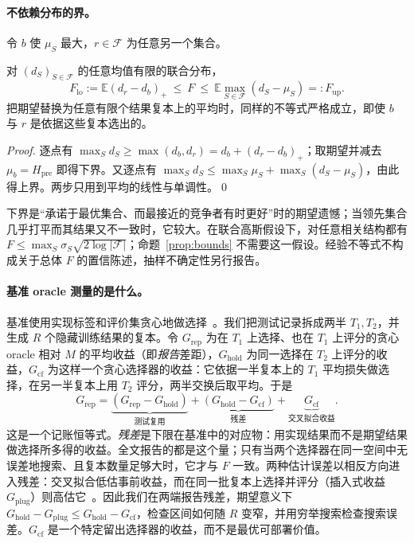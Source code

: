 \documentclass[runningheads]{llncs}
\newcommand{\Hpre}{H_{\mathrm{pre}}}
\begin{document}
\paragraph{不依赖分布的界。}令 $b$ 使 $\mu_S$ 最大，$r\in\mathcal F$ 为任意另一个集合。
\begin{mprop}\label{prop:bounds}
对 $(d_S)_{S\in\mathcal F}$ 的任意均值有限的联合分布，
\begin{equation}
 F_{\mathrm{lo}}:=\mathbb E(d_r-d_b)_+\ \le\ F\ \le\ \mathbb E\max_{S\in\mathcal F}(d_S-\mu_S)=:F_{\mathrm{up}} .\label{eq:bounds}
\end{equation}
把期望替换为任意有限个结果复本上的平均时，同样的不等式严格成立，即使 $b$ 与 $r$ 是依据这些复本选出的。
\end{mprop}
\begin{proof}
逐点有 $\max_S d_S\ge\max(d_b,d_r)=d_b+(d_r-d_b)_+$；取期望并减去 $\mu_b=\Hpre$ 即得下界。又逐点有 $\max_S d_S\le\max_S\mu_S+\max_S(d_S-\mu_S)$，由此得上界。两步只用到平均的线性与单调性。\qed
\end{proof}
下界是“承诺于最优集合、而最接近的竞争者有时更好”时的期望遗憾；当领先集合几乎打平而其结果又不一致时，它较大。在联合高斯假设下，对任意相关结构都有 $F\le\max_S\sigma_S\sqrt{2\log|\mathcal F|}$；命题~\ref{prop:bounds} 不需要这一假设。经验不等式不构成关于总体 $F$ 的置信陈述，抽样不确定性另行报告。

\paragraph{基准 oracle 测量的是什么。}基准使用实现标签和评价集贪心地做选择~\cite{werner2023comparable,werner2024cdalbench}。我们把测试记录拆成两半 $T_1,T_2$，并生成 $R$ 个隐藏训练结果的复本。令 $G_{\mathrm{rep}}$ 为在 $T_1$ 上选择、也在 $T_1$ 上评分的贪心 oracle 相对 $M$ 的平均收益（即\emph{报告}差距），$G_{\mathrm{hold}}$ 为同一选择在 $T_2$ 上评分的收益，$G_{\mathrm{cf}}$ 为这样一个贪心选择器的收益：它依据一半复本上的 $T_1$ 平均损失做选择，在另一半复本上用 $T_2$ 评分，两半交换后取平均。于是
\begin{equation}
 G_{\mathrm{rep}}=\underbrace{(G_{\mathrm{rep}}-G_{\mathrm{hold}})}_{\text{测试复用}}+\underbrace{(G_{\mathrm{hold}}-G_{\mathrm{cf}})}_{\text{残差}}+\underbrace{G_{\mathrm{cf}}}_{\text{交叉拟合收益}} .\label{eq:greedy}
\end{equation}
这是一个记账恒等式。\emph{残差}是下限在基准中的对应物：用实现结果而不是期望结果做选择所多得的收益。全文报告的都是这个量；只有当两个选择器在同一空间中无误差地搜索、且复本数量足够大时，它才与 $F$ 一致。两种估计误差以相反方向进入残差：交叉拟合低估事前收益，而在同一批复本上选择并评分（插入式收益 $G_{\mathrm{plug}}$）则高估它~\cite{smith2006optimizer,cawley2010overfitting}。因此我们在两端报告残差，期望意义下 $G_{\mathrm{hold}}-G_{\mathrm{plug}}\le G_{\mathrm{hold}}-G_{\mathrm{cf}}$，检查区间如何随 $R$ 变窄，并用穷举搜索检查搜索误差。$G_{\mathrm{cf}}$ 是一个特定留出选择器的收益，而不是最优可部署价值。
\end{document}
